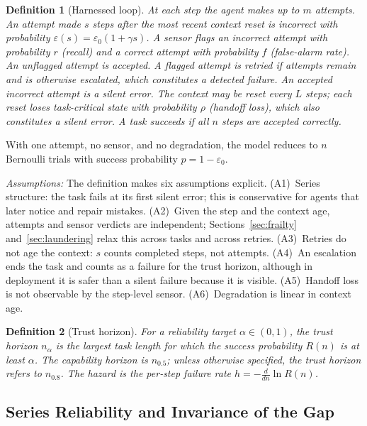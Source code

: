 \documentclass[journal]{IEEEtran}
\newtheorem{definition}{Definition}
\newcommand{\nal}{n_{\alpha}}
\begin{document}
\begin{definition}[Harnessed loop]\label{def:model}
At each step the agent makes up to $m$ attempts. An attempt made $s$ steps after the most recent context reset is incorrect with probability $\varepsilon(s)=\varepsilon_0(1+\gamma s)$. A sensor flags an incorrect attempt with probability $r$ (recall) and a correct attempt with probability $f$ (false-alarm rate). An unflagged attempt is accepted. A flagged attempt is retried if attempts remain and is otherwise escalated, which constitutes a detected failure. An accepted incorrect attempt is a silent error. The context may be reset every $L$ steps; each reset loses task-critical state with probability $\rho$ (handoff loss), which also constitutes a silent error. A task succeeds if all $n$ steps are accepted correctly.
\end{definition}

With one attempt, no sensor, and no degradation, the model reduces to $n$ Bernoulli trials with success probability $p=1-\varepsilon_0$.

\emph{Assumptions:} The definition makes six assumptions explicit.
(A1)~Series structure: the task fails at its first silent error; this is conservative for agents that later notice and repair mistakes.
(A2)~Given the step and the context age, attempts and sensor verdicts are independent; Sections~\ref{sec:frailty} and~\ref{sec:laundering} relax this across tasks and across retries.
(A3)~Retries do not age the context: $s$ counts completed steps, not attempts.
(A4)~An escalation ends the task and counts as a failure for the trust horizon, although in deployment it is safer than a silent failure because it is visible.
(A5)~Handoff loss is not observable by the step-level sensor.
(A6)~Degradation is linear in context age.

\begin{definition}[Trust horizon]\label{def:horizon}
For a reliability target $\alpha\in(0,1)$, the trust horizon $\nal$ is the largest task length for which the success probability $R(n)$ is at least $\alpha$. The capability horizon is $n_{0.5}$; unless otherwise specified, the trust horizon refers to $n_{0.8}$. The hazard is the per-step failure rate $h=-\tfrac{d}{dn}\ln R(n)$.
\end{definition}

\subsection{Series Reliability and Invariance of the Gap}\label{sec:lusser}
\end{document}
